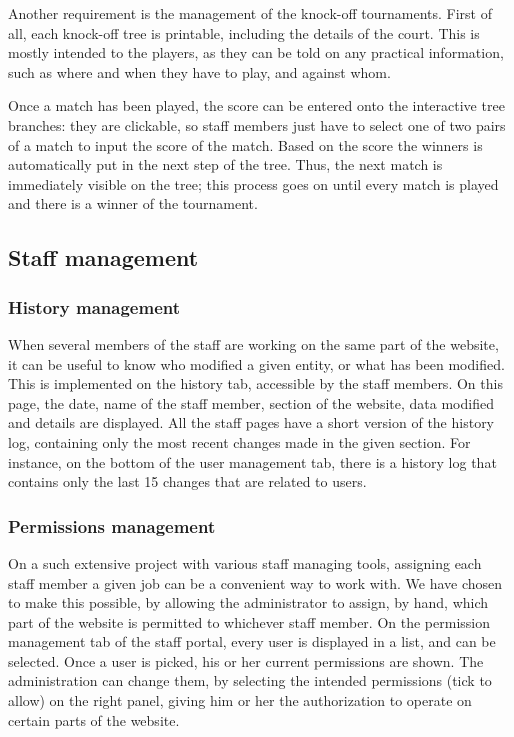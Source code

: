 
Another requirement is the management of the knock-off tournaments. First of
all, each knock-off tree is printable, including the details of the court.
This is mostly intended to the players, as they can be told on any practical
information, such as where and when they have to play, and against whom.
\newline

Once a match has been played, the score can be entered onto the interactive
tree branches: they are clickable, so staff members just have to select one of
two pairs of a match to input the score of the match. Based on the score
the winners is automatically put in the next step of the tree. Thus, the next
match is immediately visible on the tree; this process goes on until every
match is played and there is a winner of the tournament.

\subsection{Staff management}
\label{sub:Staff management}

\subsubsection{History management}
\label{subs:History management}


When several members of the staff are working on the same part of the website,
it can be useful to know who modified a given entity, or what has been modified.
This is implemented on the history tab, accessible by the staff members. On
this page, the date, name of the staff member, section of the website, data
modified and details are displayed. All the staff pages have a short version of
the history log, containing only the most recent changes made in the given
section. For instance, on the bottom of the user management tab, there is a
history log that contains only the last 15 changes that are related to users.

\subsubsection{Permissions management}
\label{subs:Permissions management}


On a such extensive project with various staff managing tools, assigning
each staff member a given job can be a convenient way to work with. We have
chosen to make this possible, by allowing the administrator to assign, by hand,
which part of the website is permitted to whichever staff member.
On the permission management tab of the staff portal, every user is displayed
in a list, and can be selected. Once a user is picked, his or her current
permissions are shown. The administration can change them, by selecting
the intended permissions (tick to allow) on the right panel,
giving him or her the authorization to operate on certain parts of the website.

